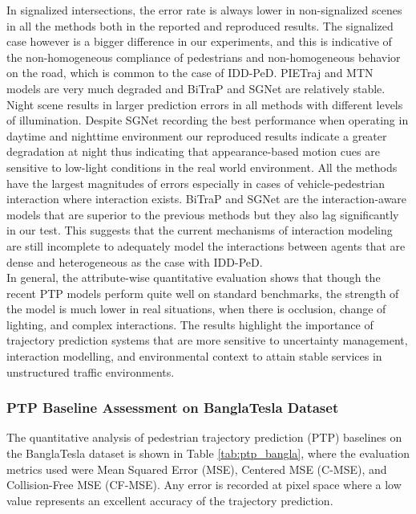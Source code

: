 \documentclass[12pt, a4paper]{article}
\begin{document}
In signalized intersections, the error rate is always lower in non-signalized scenes in all the methods both in the reported and reproduced results. The signalized case however is a bigger difference in our experiments, and this is indicative of the non-homogeneous compliance of pedestrians and non-homogeneous behavior on the road, which is common to the case of IDD-PeD. PIETraj \cite{rasouli2019pie} and MTN \cite{yin2021multimodal} models are very much degraded and BiTraP and SGNet are relatively stable. Night scene results in larger prediction errors in all methods with different levels of illumination. Despite SGNet recording the best performance when operating in daytime and nighttime environment our reproduced results indicate a greater degradation at night thus indicating that appearance-based motion cues are sensitive to low-light conditions in the real world environment. All the methods have the largest magnitudes of errors especially in cases of vehicle-pedestrian interaction where interaction exists. BiTraP and SGNet are the interaction-aware models that are superior to the previous methods but they also lag significantly in our test. This suggests that the current mechanisms of interaction modeling are still incomplete to adequately model the interactions between agents that are dense and heterogeneous as the case with IDD-PeD.\\

In general, the attribute-wise quantitative evaluation shows that though the recent PTP models perform quite well on standard benchmarks, the strength of the model is much lower in real situations, when there is occlusion, change of lighting, and complex interactions. The results highlight the importance of trajectory prediction systems that are more sensitive to uncertainty management, interaction modelling, and environmental context to attain stable services in unstructured traffic environments.

\subsubsection{PTP Baseline Assessment on BanglaTesla Dataset}
The quantitative analysis of pedestrian trajectory prediction (PTP) baselines on the BanglaTesla dataset is shown in Table \ref{tab:ptp_bangla}, where the evaluation metrics used were Mean Squared Error (MSE), Centered MSE (C-MSE), and Collision-Free MSE (CF-MSE). Any error is recorded at pixel space where a low value represents an excellent accuracy of the trajectory prediction.\\
\end{document}
